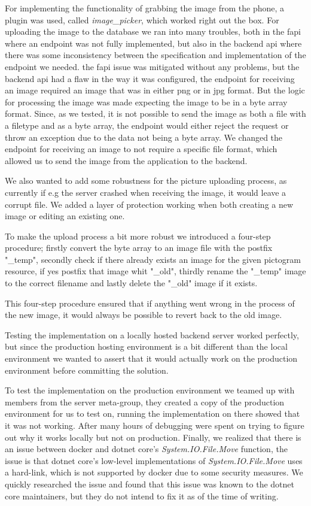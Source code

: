 For implementing the functionality of grabbing the image from the phone, a plugin was used, called \textit{image\_picker}, which worked right out the box.
For uploading the image to the database we ran into many troubles, both in the \gls{fapi} where an endpoint was not fully implemented, but also in the backend \gls{api} where there was some inconsistency between the specification and implementation of the endpoint we needed. the \gls{fapi} issue was mitigated without any problems, but the backend \gls{api} had a flaw in the way it was configured, the endpoint for receiving an image required an image that was in either png or in jpg format. But the logic for processing the image was made expecting the image to be in a byte array format. Since, as we tested, it is not possible to send the image as both a file with a filetype and as a byte array, the endpoint would either reject the request or throw an exception due to the data not being a byte array.
We changed the endpoint for receiving an image to not require a specific file format, which allowed us to send the image from the application to the backend.

We also wanted to add some robustness for the picture uploading process, as currently if e.g the server crashed when receiving the image, it would leave a corrupt file. We added a layer of protection working when both creating a new image or editing an existing one.

To make the upload process a bit more robust we introduced a four-step procedure; firstly convert the byte array to an image file with the postfix "\_temp", secondly check if there already exists an image for the given pictogram resource, if yes postfix that image whit "\_old", thirdly rename the "\_temp" image to the correct filename and lastly delete the "\_old" image if it exists.

This four-step procedure ensured that if anything went wrong in the process of the new image, it would always be possible to revert back to the old image.

Testing the implementation on a locally hosted backend server worked perfectly, but since the production hosting environment is a bit different than the local environment we wanted to assert that it would actually work on the production environment before committing the solution.

To test the implementation on the production environment we teamed up with members from the server meta-group, they created a copy of the production environment for us to test on, running the implementation on there showed that it was not working. After many hours of debugging were spent on trying to figure out why it works locally but not on production. Finally, we realized that there is an issue between docker and dotnet core's \textit{System.IO.File.Move} function, the issue is that dotnet core's low-level implementations of \textit{System.IO.File.Move} uses a hard-link, which is not supported by docker due to some security measures. We quickly researched the issue and found that this issue was known to the dotnet core maintainers, but they do not intend to fix it as of the time of writing.


